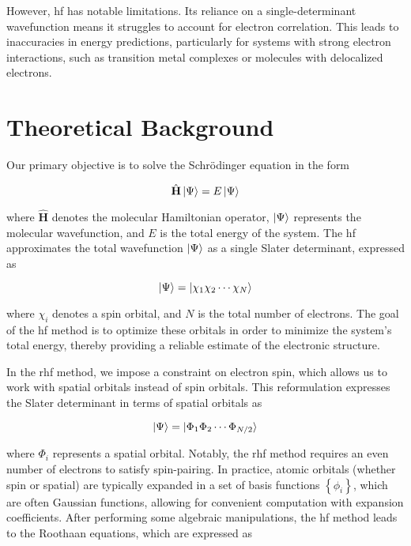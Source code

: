 However, \acrshort{hf} has notable limitations. Its reliance on a single-determinant wavefunction means it struggles to account for electron correlation. This leads to inaccuracies in energy predictions, particularly for systems with strong electron interactions, such as transition metal complexes or molecules with delocalized electrons.

\section{Theoretical Background}

Our primary objective is to solve the Schrödinger equation in the form

\begin{equation}
\hat{\mathbf{H}}\ket{\Psi}=E\ket{\Psi}
\end{equation}

where \(\hat{\mathbf{H}}\) denotes the molecular Hamiltonian operator, \(\ket{\Psi}\) represents the molecular wavefunction, and \(E\) is the total energy of the system. The \acrshort{hf} approximates the total wavefunction \(\ket{\Psi}\) as a single Slater determinant, expressed as

\begin{equation}
\ket{\Psi}=\ket{\chi_1\chi_2\cdots\chi_N}
\end{equation}

where \(\chi_i\) denotes a spin orbital, and \(N\) is the total number of electrons. The goal of the \acrshort{hf} method is to optimize these orbitals in order to minimize the system's total energy, thereby providing a reliable estimate of the electronic structure.

In the \acrfull{rhf} method, we impose a constraint on electron spin, which allows us to work with spatial orbitals instead of spin orbitals. This reformulation expresses the Slater determinant in terms of spatial orbitals as

\begin{equation}
\ket{\Psi}=\ket{\Phi_1\Phi_2\cdots\Phi_{N/2}}
\end{equation}

where \(\Phi_i\) represents a spatial orbital. Notably, the \acrshort{rhf} method requires an even number of electrons to satisfy spin-pairing. In practice, atomic orbitals (whether spin or spatial) are typically expanded in a set of basis functions \(\left\lbrace\phi_i\right\rbrace\), which are often Gaussian functions, allowing for convenient computation with expansion coefficients. After performing some algebraic manipulations, the \acrshort{hf} method leads to the Roothaan equations, which are expressed as

